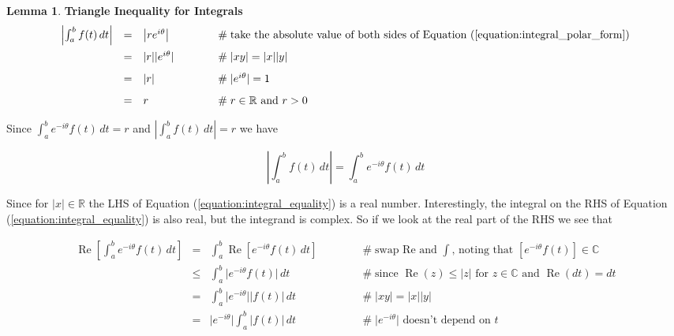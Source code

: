 \documentclass{article}
\theoremstyle{definition}
\newtheorem{lemma}{Lemma}[section]
\begin{document}
\begin{lemma} {\bf Triangle Inequality for Integrals}
\begin{equation*}
\begin{array}{llll}
\left | \int_{a}^{b} f(t) \, dt \right | 
&=& \left | re^{i\theta} \right |
	&\hspace{3em} \mathrel{\#} \text{take the absolute value of both sides of Equation (\ref{equation:integral_polar_form})} \\
[8pt]
&=& |r||e^{i\theta}|
	&\hspace{3em} \mathrel{\#} |xy| = |x||y| \\
[8pt]
&=& |r|
	&\hspace{3em} \mathrel{\#} |e^{i\theta}| = 1 \\
[8pt]
&=& r
	&\hspace{3em} \mathrel{\#} \text{$r \in \mathbb{R}$ and $r > 0$} \\
\end{array}
\end{equation*}

\bigskip
\noindent
Since $\int_{a}^{b} e^{-i\theta} f(t) \, dt  = r$ and 
$\left | \int_{a}^{b} f(t) \, dt \right | = r$ we have

\bigskip
\begin{equation}
\left | \int_{a}^{b} f(t) \, dt \right | = \int_{a}^{b} 
e^{-i\theta} f(t) \, dt 
\label{equation:integral_equality}
\end{equation}

\bigskip
\noindent
Since for $|x| \in \mathbb{R}$ the LHS of Equation (\ref{equation:integral_equality})
is a real number. Interestingly, the integral on the RHS of Equation (\ref{equation:integral_equality}) 
is also real, but the integrand is complex. So if we look at the real part of the RHS 
we see that

\begin{equation*}
\begin{array}{llll}
{\displaystyle \operatorname{Re} \left [ \int_{a}^{b} e^{-i\theta} f(t) \, dt \right ]} 
&=& {\displaystyle \int_{a}^{b} \operatorname{Re} \left [e^{-i\theta} f(t) \, dt \right ] }
	&\hspace{3em} \mathrel{\#} \text{swap Re and $\int$, noting that $\left [e^{-i\theta} f(t) \right ] \in \mathbb{C}$} \\
[10pt]
&\leq& {\displaystyle \int_{a}^{b} \big | e^{-i\theta} f(t) \big | \, dt}
	&\hspace{3em} \mathrel{\#} \text{since $\operatorname{Re}(z) \leq |z|$ for $z \in \mathbb{C}$ and $\operatorname{Re}(dt) = dt$} \\
[10pt]
&=& {\displaystyle \int_{a}^{b} \big | e^{-i\theta} \big | \left | f(t) \right | \, dt}
	&\hspace{3em} \mathrel{\#} |xy| = |x||y| \\
[10pt]
&=& {\displaystyle \big | e^{-i\theta} \big | \int_{a}^{b}  \left | f(t) \right | \, dt}
	&\hspace{3em} \mathrel{\#} \text{$\big | e^{-i\theta} \big |$ doesn't depend on $t$} \\
[10pt]


\end{array}
\end{equation*}
\end{lemma}
\end{document}
